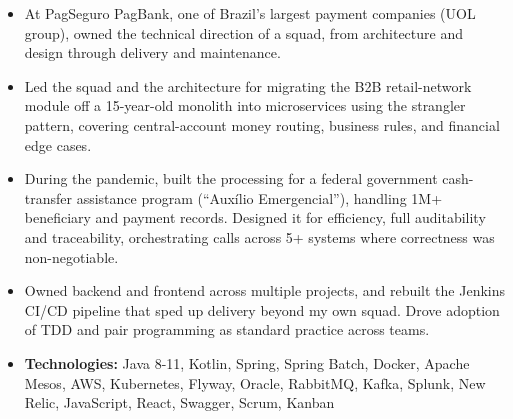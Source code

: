 \documentclass[10pt,a4paper,normalphoto]{altacv}
\newcommand{\jobguard}{\vspace{2pt}\Needspace{8\baselineskip}}
\newcommand{\techline}[1]{\vspace{3pt}\item[--]{\footnotesize\linespread{0.92}\selectfont \textbf{Technologies:} #1}}
\begin{document}
\jobguard
{}
\begin{itemize}
\item[\phantom{{\small\textbullet}}] At PagSeguro PagBank, one of Brazil's largest payment companies (UOL group), owned the technical direction of a squad, from architecture and design through delivery and maintenance.
\newline
\item Led the squad and the architecture for migrating the B2B retail-network module off a 15-year-old monolith into microservices using the strangler pattern, covering central-account money routing, business rules, and financial edge cases.
\item During the pandemic, built the processing for a federal government cash-transfer assistance program (``Aux\'ilio Emergencial''), handling 1M+ beneficiary and payment records. Designed it for efficiency, full auditability and traceability, orchestrating calls across 5+ systems where correctness was non-negotiable.
\item Owned backend and frontend across multiple projects, and rebuilt the Jenkins CI/CD pipeline that sped up delivery beyond my own squad. Drove adoption of TDD and pair programming as standard practice across teams.
\techline{Java 8-11, Kotlin, Spring, Spring Batch, Docker, Apache Mesos, AWS, Kubernetes, Flyway, Oracle, RabbitMQ, Kafka, Splunk, New Relic, JavaScript, React, Swagger, Scrum, Kanban}
\end{itemize}
\divider
\end{document}
